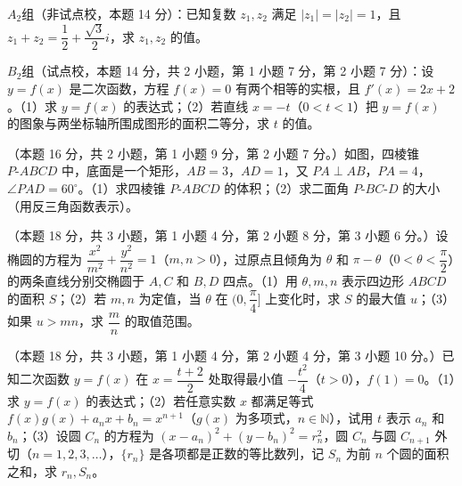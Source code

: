 \begin{question}

$A_2$组（非试点校，本题 14 分）：已知复数 $z_1,z_2$ 满足 $|z_1|=|z_2|=1$，且 $z_1+z_2=\dfrac12+\dfrac{\sqrt3}{2}i$，求 $z_1,z_2$ 的值。

$B_2$组（试点校，本题 14 分，共 2 小题，第 1 小题 7 分，第 2 小题 7 分）：设 $y=f(x)$ 是二次函数，方程 $f(x)=0$ 有两个相等的实根，且 $f'(x)=2x+2$。（1）求 $y=f(x)$ 的表达式；（2）若直线 $x=-t$（$0<t<1$）把 $y=f(x)$ 的图象与两坐标轴所围成图形的面积二等分，求 $t$ 的值。

\Needspace{0.4\textheight}
\end{question}
\begin{question}
（本题 16 分，共 2 小题，第 1 小题 9 分，第 2 小题 7 分。）如图，四棱锥 $P\text{-}ABCD$ 中，底面是一个矩形，$AB=3$，$AD=1$，又 $PA\perp AB$，$PA=4$，$\angle PAD=60^\circ$。（1）求四棱锥 $P\text{-}ABCD$ 的体积；（2）求二面角 $P\text{-}BC\text{-}D$ 的大小（用反三角函数表示）。
\nopagebreak[4]
\begin{center}\end{center}
\nopagebreak[4]
\end{question}
\begin{question}
（本题 18 分，共 3 小题，第 1 小题 4 分，第 2 小题 8 分，第 3 小题 6 分。）设椭圆的方程为 $\dfrac{x^2}{m^2}+\dfrac{y^2}{n^2}=1$（$m,n>0$），过原点且倾角为 $\theta$ 和 $\pi-\theta$（$0<\theta<\dfrac\pi2$）的两条直线分别交椭圆于 $A,C$ 和 $B,D$ 四点。（1）用 $\theta,m,n$ 表示四边形 $ABCD$ 的面积 $S$；（2）若 $m,n$ 为定值，当 $\theta$ 在 $(0,\dfrac\pi4]$ 上变化时，求 $S$ 的最大值 $u$；（3）如果 $u>mn$，求 $\dfrac mn$ 的取值范围。

\end{question}
\begin{question}
（本题 18 分，共 3 小题，第 1 小题 4 分，第 2 小题 4 分，第 3 小题 10 分。）已知二次函数 $y=f(x)$ 在 $x=\dfrac{t+2}{2}$ 处取得最小值 $-\dfrac{t^2}{4}$（$t>0$），$f(1)=0$。（1）求 $y=f(x)$ 的表达式；（2）若任意实数 $x$ 都满足等式 $f(x)g(x)+a_nx+b_n=x^{n+1}$（$g(x)$ 为多项式，$n\in\mathbb N$），试用 $t$ 表示 $a_n$ 和 $b_n$；（3）设圆 $C_n$ 的方程为 $(x-a_n)^2+(y-b_n)^2=r_n^2$，圆 $C_n$ 与圆 $C_{n+1}$ 外切（$n=1,2,3,\ldots$），$\{r_n\}$ 是各项都是正数的等比数列，记 $S_n$ 为前 $n$ 个圆的面积之和，求 $r_n,S_n$。

\end{question}